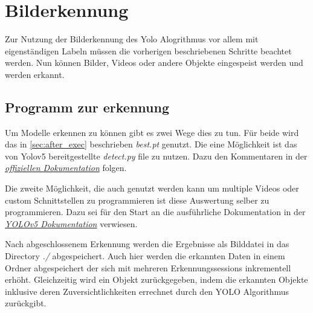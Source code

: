 \chapter{Bilderkennung}

Zur Nutzung der Bilderkennung des Yolo Alogrithmus vor allem mit eigenständigen Labeln müssen die vorherigen beschriebenen Schritte beachtet werden. Nun können Bilder, Videos oder andere Objekte eingespeist werden und werden erkannt.


\section{Programm zur erkennung}
Um Modelle erkennen zu können gibt es zwei Wege dies zu tun. Für beide wird das in \autoref{sec:after_exec} beschrieben \textit{best.pt} genutzt. Die eine Möglichkeit ist das von Yolov5 bereitgestellte \textit{detect.py} file zu nutzen. Dazu den Kommentaren in der \textit{\href{https://github.com/ultralytics/yolov5/blob/master/detect.py}{offiziellen Dokumentation}} folgen. 

Die zweite Möglichkeit, die auch genutzt werden kann um multiple Videos oder custom Schnittstellen zu programmieren ist diese Auswertung selber zu programmieren. Dazu sei für den Start an die ausführliche Dokumentation in der \textit{\href{https://github.com/ultralytics/yolov5/issues/36}{YOLOv5 Dokumentation}} verwiesen.

Nach abgeschlossenem Erkennung werden die Ergebnisse als Bilddatei in das Directory \textit{./} abgespeichert. Auch hier werden die erkannten Daten in einem Ordner abgespeichert der sich mit mehreren Erkennungssessions inkrementell erhöht. Gleichzeitig wird ein Objekt zurückgegeben, indem die erkannten Objekte inklusive deren Zuversichtlichkeiten errechnet durch den YOLO Algorithmus zurückgibt.